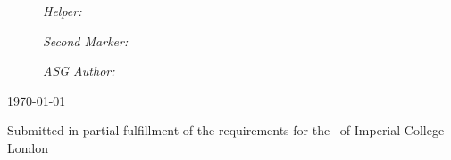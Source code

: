\begin{title}
\begin{figure}[H]
	\begin{minipage}[t]{0.32 \linewidth}
 		\large\emph{Helper:} \\
		\helper
	\end{minipage}
	\begin{minipage}[t]{0.34 \linewidth}
	\centering
 		\large\emph{Second Marker:} \\
		\secondmarker
	\end{minipage}
	\begin{minipage}[t]{0.32 \linewidth}
	\begin{flushright}
 		\large\emph{ASG Author:} \\
		\asgauthor
	\end{flushright}
	\end{minipage}
\end{figure}

\mbox{}




{\large \today} %


\vfill %
Submitted in partial fulfillment of the requirements for the \degreetype~of Imperial College London

\end{title}
